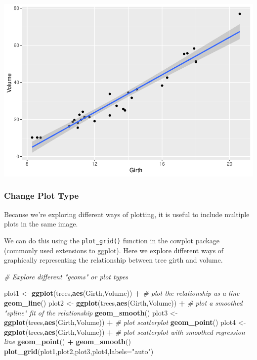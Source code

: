 \documentclass[
]{article}
\newenvironment{Shaded}{\begin{snugshade}}{\end{snugshade}}
\newcommand{\AttributeTok}[1]{\textcolor[rgb]{0.13,0.29,0.53}{#1}}
\newcommand{\CommentTok}[1]{\textcolor[rgb]{0.56,0.35,0.01}{\textit{#1}}}
\newcommand{\FunctionTok}[1]{\textcolor[rgb]{0.13,0.29,0.53}{\textbf{#1}}}
\newcommand{\NormalTok}[1]{#1}
\newcommand{\OtherTok}[1]{\textcolor[rgb]{0.56,0.35,0.01}{#1}}
\newcommand{\SpecialCharTok}[1]{\textcolor[rgb]{0.81,0.36,0.00}{\textbf{#1}}}
\newcommand{\StringTok}[1]{\textcolor[rgb]{0.31,0.60,0.02}{#1}}
\begin{document}
\includegraphics{module1_3_files/figure-latex/unnamed-chunk-9-3.pdf}

\hypertarget{change-plot-type}{%
\subsubsection{Change Plot Type}\label{change-plot-type}}

Because we're exploring different ways of plotting, it is useful to
include multiple plots in the same image.

We can do this using the \texttt{plot\_grid()} function in the cowplot
package (commonly used extensions to ggplot). Here we explore different
ways of graphically representing the relationship between tree girth and
volume.

\begin{Shaded}
\begin{Highlighting}[]
\CommentTok{\# Explore different "geoms" or plot types }

\NormalTok{plot1 }\OtherTok{\textless{}{-}} \FunctionTok{ggplot}\NormalTok{(trees,}\FunctionTok{aes}\NormalTok{(Girth,Volume)) }\SpecialCharTok{+}    \CommentTok{\# plot the relationship as a line}
  \FunctionTok{geom\_line}\NormalTok{()}
\NormalTok{plot2 }\OtherTok{\textless{}{-}} \FunctionTok{ggplot}\NormalTok{(trees,}\FunctionTok{aes}\NormalTok{(Girth,Volume)) }\SpecialCharTok{+}    \CommentTok{\# plot a smoothed "spline" fit of the relationship}
  \FunctionTok{geom\_smooth}\NormalTok{()}
\NormalTok{plot3 }\OtherTok{\textless{}{-}} \FunctionTok{ggplot}\NormalTok{(trees,}\FunctionTok{aes}\NormalTok{(Girth,Volume)) }\SpecialCharTok{+}    \CommentTok{\# plot scatterplot}
  \FunctionTok{geom\_point}\NormalTok{() }
\NormalTok{plot4 }\OtherTok{\textless{}{-}} \FunctionTok{ggplot}\NormalTok{(trees,}\FunctionTok{aes}\NormalTok{(Girth,Volume)) }\SpecialCharTok{+}    \CommentTok{\# plot scatterplot with smoothed regression line}
  \FunctionTok{geom\_point}\NormalTok{() }\SpecialCharTok{+} 
  \FunctionTok{geom\_smooth}\NormalTok{()}
\FunctionTok{plot\_grid}\NormalTok{(plot1,plot2,plot3,plot4,}\AttributeTok{labels=}\StringTok{"auto"}\NormalTok{)}
\end{Highlighting}
\end{Shaded}
\end{document}
